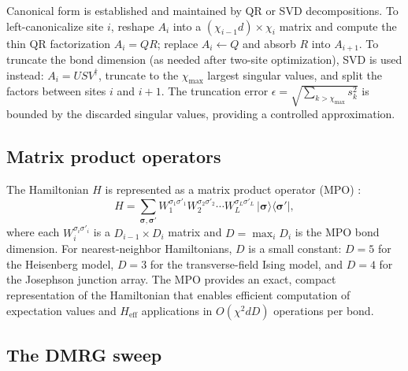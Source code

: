 \documentclass[preprint,12pt]{elsarticle}
\begin{document}
Canonical form is established and maintained by QR or SVD decompositions.
To left-canonicalize site $i$, reshape $A_i$ into a $(\chi_{i-1} d) \times \chi_i$ matrix and compute the thin QR factorization $A_i = QR$; replace $A_i \leftarrow Q$ and absorb $R$ into $A_{i+1}$.
To truncate the bond dimension (as needed after two-site optimization), SVD is used instead: $A_i = U S V^\dagger$, truncate to the $\chi_\text{max}$ largest singular values, and split the factors between sites $i$ and $i+1$.
The truncation error $\epsilon = \sqrt{\sum_{k > \chi_\text{max}} s_k^2}$ is bounded by the discarded singular values, providing a controlled approximation.

\subsection{Matrix product operators}
\label{sec:mpo}

The Hamiltonian $H$ is represented as a matrix product operator (MPO) \cite{Schollwoeck2011,Orus2014}:
\begin{equation}
  H = \sum_{\boldsymbol{\sigma}, \boldsymbol{\sigma}'} W^{\sigma_1 \sigma'_1}_1 W^{\sigma_2 \sigma'_2}_2 \cdots W^{\sigma_L \sigma'_L}_L \, |\boldsymbol{\sigma}\rangle\langle\boldsymbol{\sigma}'|,
\end{equation}
where each $W^{\sigma_i \sigma'_i}_i$ is a $D_{i-1} \times D_i$ matrix and $D = \max_i D_i$ is the MPO bond dimension.
For nearest-neighbor Hamiltonians, $D$ is a small constant: $D = 5$ for the Heisenberg model, $D = 3$ for the transverse-field Ising model, and $D = 4$ for the Josephson junction array.
The MPO provides an exact, compact representation of the Hamiltonian that enables efficient computation of expectation values and $H_\text{eff}$ applications in $O(\chi^2 d D)$ operations per bond.

\subsection{The DMRG sweep}
\label{sec:dmrg}
\end{document}
